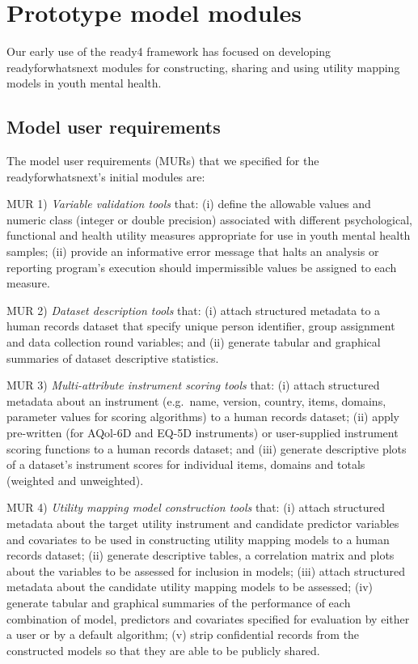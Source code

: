 \documentclass[sn-vancouver,Numbered,pdflatex]{sn-jnl}
\theoremstyle{remark}
\theoremstyle{definition}
\begin{document}
\hypertarget{prototype-model-modules}{%
\section{Prototype model modules}\label{prototype-model-modules}}

Our early use of the ready4 framework has focused on developing readyforwhatsnext modules for constructing, sharing and using utility mapping models in youth mental health.

\hypertarget{model-user-requirements}{%
\subsection{Model user requirements}\label{model-user-requirements}}

The model user requirements (MURs) that we specified for the readyforwhatsnext's initial modules are:

MUR 1) \emph{Variable validation tools} that: (i) define the allowable values and numeric class (integer or double precision) associated with different psychological, functional and health utility measures appropriate for use in youth mental health samples; (ii) provide an informative error message that halts an analysis or reporting program's execution should impermissible values be assigned to each measure.

MUR 2) \emph{Dataset description tools} that: (i) attach structured metadata to a human records dataset that specify unique person identifier, group assignment and data collection round variables; and (ii) generate tabular and graphical summaries of dataset descriptive statistics.

MUR 3) \emph{Multi-attribute instrument scoring tools} that: (i) attach structured metadata about an instrument (e.g.~name, version, country, items, domains, parameter values for scoring algorithms) to a human records dataset; (ii) apply pre-written (for AQol-6D \citep{Richardson2012AQ} and EQ-5D \citep{devlin2017eq} instruments) or user-supplied instrument scoring functions to a human records dataset; and (iii) generate descriptive plots of a dataset's instrument scores for individual items, domains and totals (weighted and unweighted).

MUR 4) \emph{Utility mapping model construction tools} that: (i) attach structured metadata about the target utility instrument and candidate predictor variables and covariates to be used in constructing utility mapping models to a human records dataset; (ii) generate descriptive tables, a correlation matrix and plots about the variables to be assessed for inclusion in models; (iii) attach structured metadata about the candidate utility mapping models to be assessed; (iv) generate tabular and graphical summaries of the performance of each combination of model, predictors and covariates specified for evaluation by either a user or by a default algorithm; (v) strip confidential records from the constructed models so that they are able to be publicly shared.
\end{document}

